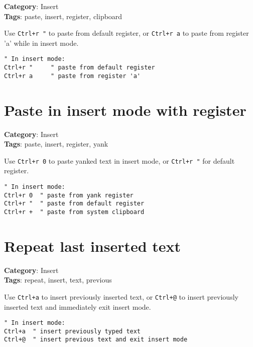 {{{{{\textbf{Category}: Insert\\ \textbf{Tags}: paste, insert, register, clipboard
\vspace{0.5cm}

Use {\footnotesize \Verb§Ctrl+r "§} to paste from default register, or {\footnotesize \Verb§Ctrl+r a§} to paste from register 'a' while in insert mode.

\begin{Exa*}{}
\begin{Verbatim}[fontsize=\footnotesize, breaklines, breakanywhere]
" In insert mode:
Ctrl+r "     " paste from default register
Ctrl+r a     " paste from register 'a'
\end{Verbatim}
\end{Exa*}

\section{Paste in insert mode with register}

\textbf{Category}: Insert\\ \textbf{Tags}: paste, insert, register, yank
\vspace{0.5cm}

Use {\footnotesize \Verb§Ctrl+r 0§} to paste yanked text in insert mode, or {\footnotesize \Verb§Ctrl+r "§} for default register.

\begin{Exa*}{}
\begin{Verbatim}[fontsize=\footnotesize, breaklines, breakanywhere]
" In insert mode:
Ctrl+r 0  " paste from yank register
Ctrl+r "  " paste from default register
Ctrl+r +  " paste from system clipboard
\end{Verbatim}
\end{Exa*}

\section{Repeat last inserted text}

\textbf{Category}: Insert\\ \textbf{Tags}: repeat, insert, text, previous
\vspace{0.5cm}

Use {\footnotesize \Verb§Ctrl+a§} to insert previously inserted text, or {\footnotesize \Verb§Ctrl+@§} to insert previously inserted text and immediately exit insert mode.

\begin{Exa*}{}
\begin{Verbatim}[fontsize=\footnotesize, breaklines, breakanywhere]
" In insert mode:
Ctrl+a  " insert previously typed text
Ctrl+@  " insert previous text and exit insert mode
\end{Verbatim}
\end{Exa*}

}}}}}
